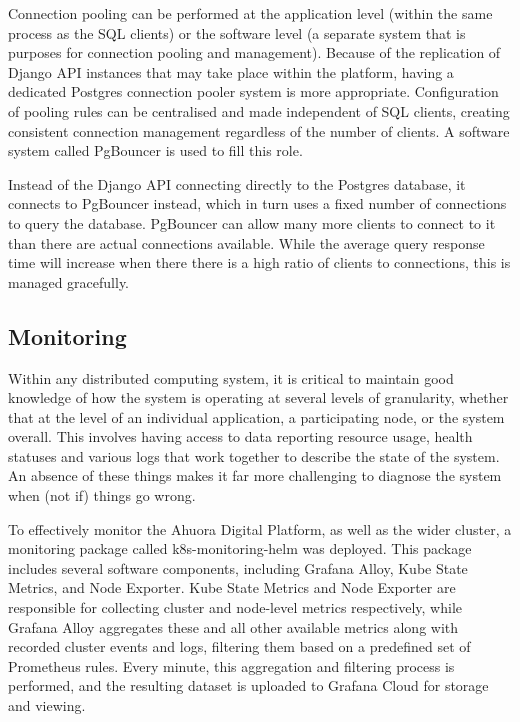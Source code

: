 Connection pooling can be performed at the application level (within the same process as the SQL clients) or the software level (a separate system that is purposes for connection pooling and management). Because of the replication of Django API instances that may take place within the platform, having a dedicated Postgres connection pooler system is more appropriate. Configuration of pooling rules can be centralised and made independent of SQL clients, creating consistent connection management regardless of the number of clients. A software system called PgBouncer is used to fill this role.

Instead of the Django API connecting directly to the Postgres database, it connects to PgBouncer instead, which in turn uses a fixed number of connections to query the database. PgBouncer can allow many more clients to connect to it than there are actual connections available. While the average query response time will increase when there there is a high ratio of clients to connections, this is managed gracefully.


\subsection{Monitoring}

Within any distributed computing system, it is critical to maintain good knowledge of how the system is operating at several levels of granularity, whether that at the level of an individual application, a participating node, or the system overall. This involves having access to data reporting resource usage, health statuses and various logs that work together to describe the state of the system. An absence of these things makes it far more challenging to diagnose the system when (not if) things go wrong.

To effectively monitor the Ahuora Digital Platform, as well as the wider cluster, a monitoring package called k8s-monitoring-helm was deployed. This package includes several software components, including Grafana Alloy, Kube State Metrics, and Node Exporter. Kube State Metrics and Node Exporter are responsible for collecting cluster and node-level metrics respectively, while Grafana Alloy aggregates these and all other available metrics along with recorded cluster events and logs, filtering them based on a predefined set of Prometheus rules. Every minute, this aggregation and filtering process is performed, and the resulting dataset is uploaded to Grafana Cloud for storage and viewing.

